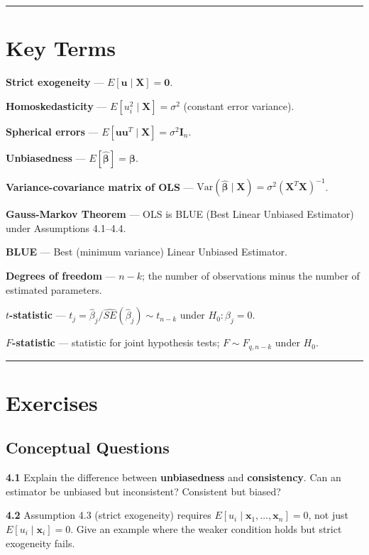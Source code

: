 \medskip\hrule\medskip

\section{Key Terms}

\textbf{Strict exogeneity} --- $E[\mathbf{u} \mid \mathbf{X}] = \mathbf{0}$.

\textbf{Homoskedasticity} --- $E[u_i^2 \mid \mathbf{X}] = \sigma^2$ (constant error variance).

\textbf{Spherical errors} --- $E[\mathbf{u}\mathbf{u}^T \mid \mathbf{X}] = \sigma^2 \mathbf{I}_n$.

\textbf{Unbiasedness} --- $E[\hat{\boldsymbol{\beta}}] = \boldsymbol{\beta}$.

\textbf{Variance-covariance matrix of OLS} --- $\text{Var}(\hat{\boldsymbol{\beta}} \mid \mathbf{X}) = \sigma^2(\mathbf{X}^T\mathbf{X})^{-1}$.

\textbf{Gauss-Markov Theorem} --- OLS is BLUE (Best Linear Unbiased Estimator) under Assumptions 4.1--4.4.

\textbf{BLUE} --- Best (minimum variance) Linear Unbiased Estimator.

\textbf{Degrees of freedom} --- $n - k$; the number of observations minus the number of estimated parameters.

\textbf{$t$-statistic} --- $t_j = \hat{\beta}_j / \widehat{SE}(\hat{\beta}_j) \sim t_{n-k}$ under $H_0: \beta_j = 0$.

\textbf{$F$-statistic} --- statistic for joint hypothesis tests; $F \sim F_{q, n-k}$ under $H_0$.

\medskip\hrule\medskip

\section{Exercises}

\subsection{Conceptual Questions}

\textbf{4.1} Explain the difference between \textbf{unbiasedness} and \textbf{consistency}. Can an estimator be unbiased but inconsistent? Consistent but biased?

\textbf{4.2} Assumption 4.3 (strict exogeneity) requires $E[u_i \mid \mathbf{x}_1, \ldots, \mathbf{x}_n] = 0$, not just $E[u_i \mid \mathbf{x}_i] = 0$. Give an example where the weaker condition holds but strict exogeneity fails.

